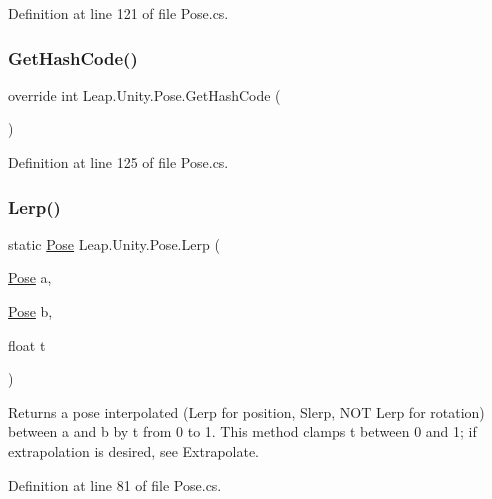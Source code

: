 Definition at line 121 of file Pose.\+cs.

\mbox{\label{struct_leap_1_1_unity_1_1_pose_a6a907351d0a69845338c3464a6658d8b}} 
\subsubsection{\texorpdfstring{GetHashCode()}{GetHashCode()}}
{\footnotesize\ttfamily override int Leap.\+Unity.\+Pose.\+Get\+Hash\+Code (\begin{DoxyParamCaption}{ }\end{DoxyParamCaption})}



Definition at line 125 of file Pose.\+cs.

\mbox{\label{struct_leap_1_1_unity_1_1_pose_aac1241e7aec5379dc1aa001526532016}} 
\subsubsection{\texorpdfstring{Lerp()}{Lerp()}}
{\footnotesize\ttfamily static \mbox{\hyperlink{struct_leap_1_1_unity_1_1_pose}{Pose}} Leap.\+Unity.\+Pose.\+Lerp (\begin{DoxyParamCaption}\item[{\mbox{\hyperlink{struct_leap_1_1_unity_1_1_pose}{Pose}}}]{a,  }\item[{\mbox{\hyperlink{struct_leap_1_1_unity_1_1_pose}{Pose}}}]{b,  }\item[{float}]{t }\end{DoxyParamCaption})\hspace{0.3cm}{\ttfamily [static]}}



Returns a pose interpolated (Lerp for position, Slerp, N\+OT Lerp for rotation) between a and b by t from 0 to 1. This method clamps t between 0 and 1; if extrapolation is desired, see Extrapolate. 



Definition at line 81 of file Pose.\+cs.

\mbox{\label{struct_leap_1_1_unity_1_1_pose_a4a16c9cf3281db86bdb0160d80b4cf3a}} 
